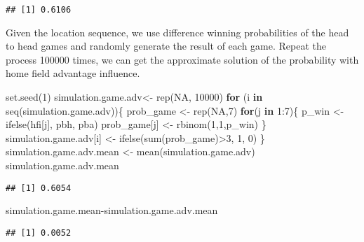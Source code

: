\documentclass[
]{article}
\newenvironment{Shaded}{\begin{snugshade}}{\end{snugshade}}
\newcommand{\ConstantTok}[1]{\textcolor[rgb]{0.00,0.00,0.00}{#1}}
\newcommand{\ControlFlowTok}[1]{\textcolor[rgb]{0.13,0.29,0.53}{\textbf{#1}}}
\newcommand{\DecValTok}[1]{\textcolor[rgb]{0.00,0.00,0.81}{#1}}
\newcommand{\FunctionTok}[1]{\textcolor[rgb]{0.00,0.00,0.00}{#1}}
\newcommand{\NormalTok}[1]{#1}
\newcommand{\OtherTok}[1]{\textcolor[rgb]{0.56,0.35,0.01}{#1}}
\newcommand{\SpecialCharTok}[1]{\textcolor[rgb]{0.00,0.00,0.00}{#1}}
\begin{document}
\begin{verbatim}
## [1] 0.6106
\end{verbatim}

Given the location sequence, we use difference winning probabilities of
the head to head games and randomly generate the result of each game.
Repeat the process 100000 times, we can get the approximate solution of
the probability with home field advantage influence.

\begin{Shaded}
\begin{Highlighting}[]
\FunctionTok{set.seed}\NormalTok{(}\DecValTok{1}\NormalTok{)}
\NormalTok{simulation.game.adv}\OtherTok{\textless{}{-}} \FunctionTok{rep}\NormalTok{(}\ConstantTok{NA}\NormalTok{, }\DecValTok{10000}\NormalTok{)}
\ControlFlowTok{for}\NormalTok{ (i }\ControlFlowTok{in} \FunctionTok{seq}\NormalTok{(simulation.game.adv))\{}
\NormalTok{  prob\_game }\OtherTok{\textless{}{-}} \FunctionTok{rep}\NormalTok{(}\ConstantTok{NA}\NormalTok{,}\DecValTok{7}\NormalTok{)}
  \ControlFlowTok{for}\NormalTok{(j }\ControlFlowTok{in} \DecValTok{1}\SpecialCharTok{:}\DecValTok{7}\NormalTok{)\{}
\NormalTok{    p\_win }\OtherTok{\textless{}{-}} \FunctionTok{ifelse}\NormalTok{(hfi[j], pbh, pba)}
\NormalTok{    prob\_game[j] }\OtherTok{\textless{}{-}} \FunctionTok{rbinom}\NormalTok{(}\DecValTok{1}\NormalTok{,}\DecValTok{1}\NormalTok{,p\_win)}
\NormalTok{  \}}
\NormalTok{  simulation.game.adv[i] }\OtherTok{\textless{}{-}} \FunctionTok{ifelse}\NormalTok{(}\FunctionTok{sum}\NormalTok{(prob\_game)}\SpecialCharTok{\textgreater{}}\DecValTok{3}\NormalTok{, }\DecValTok{1}\NormalTok{, }\DecValTok{0}\NormalTok{)}
\NormalTok{\}}
\NormalTok{simulation.game.adv.mean }\OtherTok{\textless{}{-}} \FunctionTok{mean}\NormalTok{(simulation.game.adv)}
\NormalTok{simulation.game.adv.mean}
\end{Highlighting}
\end{Shaded}

\begin{verbatim}
## [1] 0.6054
\end{verbatim}

\begin{Shaded}
\begin{Highlighting}[]
\NormalTok{simulation.game.mean}\SpecialCharTok{{-}}\NormalTok{simulation.game.adv.mean}
\end{Highlighting}
\end{Shaded}

\begin{verbatim}
## [1] 0.0052
\end{verbatim}
\end{document}
